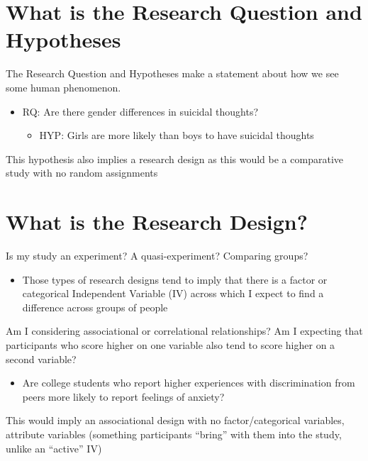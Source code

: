 \documentclass[
  letterpaper,
  DIV=11,
  numbers=noendperiod]{scrreprt}
\providecommand{\tightlist}{%
  \setlength{\itemsep}{0pt}\setlength{\parskip}{0pt}}
\begin{document}
\section{What is the Research Question and
Hypotheses}\label{what-is-the-research-question-and-hypotheses}

The Research Question and Hypotheses make a statement about how we see
some human phenomenon.

\begin{itemize}
\item
  RQ: Are there gender differences in suicidal thoughts?

  \begin{itemize}
  \tightlist
  \item
    HYP: Girls are more likely than boys to have suicidal thoughts
  \end{itemize}
\end{itemize}

This hypothesis also implies a research design as this would be a
comparative study with no random assignments

\section{What is the Research
Design?}\label{what-is-the-research-design}

Is my study an experiment? A quasi-experiment? Comparing groups?

\begin{itemize}
\tightlist
\item
  Those types of research designs tend to imply that there is a factor
  or categorical Independent Variable (IV) across which I expect to find
  a difference across groups of people
\end{itemize}

Am I considering associational or correlational relationships? Am I
expecting that participants who score higher on one variable also tend
to score higher on a second variable?

\begin{itemize}
\tightlist
\item
  Are college students who report higher experiences with discrimination
  from peers more likely to report feelings of anxiety?
\end{itemize}

This would imply an associational design with no factor/categorical
variables, attribute variables (something participants ``bring'' with
them into the study, unlike an ``active'' IV)
\end{document}
